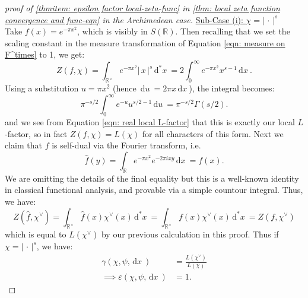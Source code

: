 \documentclass[11pt, x11names, openany]{book}
\newcommand{\rr}{\mathbb{R}}
\newcommand{\abs}[1]{\left| \, #1  \,\right|}
\renewcommand{\hat}{\widehat}
\newcommand{\du}{\, \mathrm{d}u \ }
\newcommand{\dx}{\, \mathrm{d}x \ }
\renewcommand{\d}[1]{\, \mathrm{d}#1 \ }
\begin{document}
\begin{proof}[proof of \ref{thmitem: epsilon factor local-zeta-func} in \ref{thm: local zeta function convergence and func-eqn} in the Archimedean case]
\underline{Sub-Case (i): $\chi = \abs{\cdot}^s$}\\
Take $f(x) = e^{- \pi x^2}$, which is visibly in $S(\rr)$. Then recalling that we set the scaling constant in the measure transformation of Equation \ref{eqn: measure on F^times} to 1, we get:
\begin{equation*}
    Z(f, \chi) = \int_{\rr^\times} e^{-\pi x^2} \abs{x}^s \d{^*x} = 2 \int^\infty_0 e^{-\pi x^2} x^{s-1} \dx.
\end{equation*}
Using a substitution $u = \pi x^2$ (hence $\du = 2 \pi x \dx$),  the integral becomes:
\begin{equation*}
    \pi^{-s/2} \int^\infty_0 e^{-u} u^{s/2 - 1} \du = \pi^{-s/2} \Gamma(s/2).
\end{equation*}
and we see from Equation \ref{eqn: real local L-factor} that this is exactly our local $L$-factor, so in fact $Z(f, \chi) = L(\chi)$ for all characters of this form. Next we claim that $f$ is self-dual via the Fourier transform, i.e.
\begin{equation*}
    \hat{f}(y) = \int_\rr e^{-\pi x^2} e^{-2 \pi i xy} \dx = f(x).
\end{equation*}
We are omitting the details of the final equality but this is a well-known identity in classical functional analysis, and provable via a simple countour integral. Thus, we have:
\begin{equation*}
    Z(\hat{f}, \chi^\lor) = \int_{\rr^\times} \hat{f}(x) \chi^\lor(x) \d{^*x} = \int_{\rr^\times} f(x) \chi^\lor(x) \d{^*x} = Z(f, \chi^\lor)
\end{equation*}
which is equal to $L(\chi^\lor)$ by our previous calculation in this proof. Thus if $\chi = \abs{\cdot}^s$, we have:
\begin{align}
\label{eqn: real epsilon factor 1}
    \gamma(\chi, \psi, \dx) &= \frac{L(\chi^\lor)}{L(\chi)} \nonumber \\
    \implies \varepsilon(\chi, \psi, \dx) &= 1.
\end{align}


\end{proof}
\end{document}
